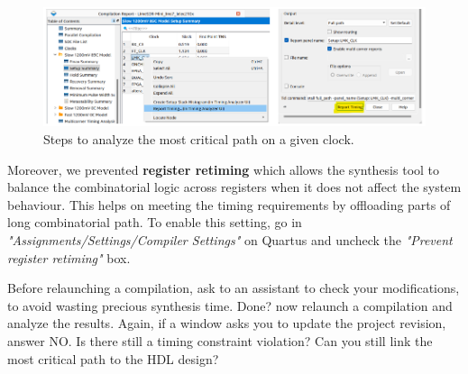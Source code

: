 \begin{figure}[h]
    \centering
    \includegraphics[width=\linewidth]{figures/Report_Timing_Analyzer.png}
    \caption{Steps to analyze the most critical path on a given clock.}
    \label{fig:report_timing_analyzer}
\end{figure}

Moreover, we prevented \textbf{register retiming} which allows the synthesis tool to balance the combinatorial logic across registers when it does not affect the system behaviour. This helps on meeting the timing requirements by offloading parts of long combinatorial path. To enable this setting, go in \textit{"Assignments/Settings/Compiler Settings"} on Quartus and uncheck the \textit{"Prevent register retiming"} box.

Before relaunching a compilation, ask to an assistant to check your modifications, to avoid wasting precious synthesis time. Done? now relaunch a compilation and analyze the results. Again, if a window asks you to update the project revision, answer NO. Is there still a timing constraint violation? Can you still link the most critical path to the HDL design?

